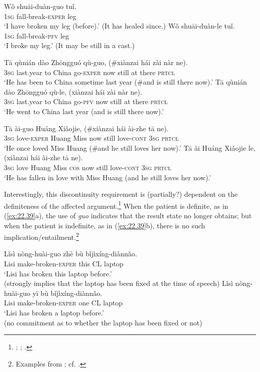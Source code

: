 \ea \label{ex:22.36}
\ea  \gll Wǒ  shuāi-duàn-guo  tuǐ.\\
\textsc{1sg}  fall-break-\textsc{exper}  leg\\
\glt ‘I have broken my leg (before).’ (It has healed since.) 
\ex \gll Wǒ  shuāi-duàn-le  tuǐ.\\
\textsc{1sg}  fall-break-\textsc{pfv}  leg\\
\glt ‘I broke my leg.’  (It may be still in a cast.)  
\z \z

\ea \label{ex:22.37}
\ea \gll Tā  qùnián  dào  Zhōngguó  qù-guo,  (\#xiànzai  hái  zài  nàr  ne).\\
\textsc{3sg}  last.year  to  China  go-\textsc{exper}    now  still  at  there  \textsc{prtcl}\\
\glt ‘He has been to China sometime last year (\#and is still there now).’ 
\ex \gll  Tā  qùnián  dào  Zhōngguó  qù-le,  (xiànzai  hái  zài  nàr  ne).\\
\textsc{3sg}  last.year  to  China  go-\textsc{pfv} now  still  at  there  \textsc{prtcl}\\
\glt ‘He went to China last year (and is still there now).’ 
\z \z

\ea \label{ex:22.38}
\ea \gll  Tā  ài-guo  Huáng  Xiǎojie,  (\#xiànzai  hái  ài-zhe  tā  ne).\\
\textsc{3sg}  love-\textsc{exper}  Huang  Miss now  still  love-\textsc{cont}  \textsc{3sg}  \textsc{prtcl}\\
\glt ‘He once loved Miss Huang (\#and he still loves her now).’ 
\ex \gll  Tā  ài  Huáng  Xiǎojie  le,  (xiànzai  hái  ài-zhe  tā  ne).\\
\textsc{3sg}  love  Huang  Miss \textsc{cos} now  still  love-\textsc{cont}  \textsc{3sg}  \textsc{prtcl}\\
\glt ‘He has fallen in love with Miss Huang (and he still loves her now).’  
\z \z


Interestingly, this discontinuity requirement is (partially?) dependent on the definiteness of the affected argument.\footnote{\citet{Lin2007}; \citet{Wu2008}; \citet{Chen2009}.} When the patient is definite, as in (\ref{ex:22.39}a), the use of \textit{guo} indicates that the result state no longer obtains; but when the patient is indefinite, as in (\ref{ex:22.39}b), there is no such implication/entailment.\footnote{Examples from \citet{Chen2009}; cf. \citet{Lin2007}.}


\ea \label{ex:22.39}
\ea  \gll Lǐsì  nòng-huài-guo  zhè  bù  bǐjìxíng-diànnǎo.\\
Lisi  make-broken-\textsc{exper}  this  CL  laptop\\
\glt ‘Lisi has broken this laptop before.’\\
(strongly implies that the laptop has been fixed at the time of speech)
\ex \gll  Lǐsì  nòng-huài-guo  yī  bù  bǐjìxíng-diànnǎo.\\
Lisi  make-broken-\textsc{exper}  one  CL  laptop\\
\glt ‘Lisi has broken a laptop before.’  \\
(no commitment as to whether the laptop has been fixed or not)
\z \z


